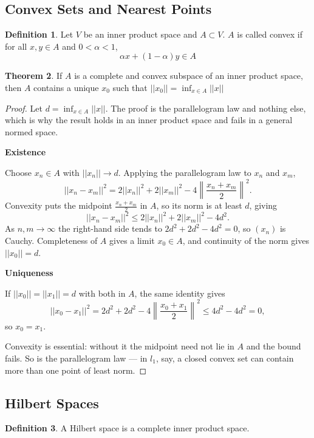 \documentclass[11pt,a4paper]{article}
\theoremstyle{definition}
\newtheorem{thm}{Theorem}[section]
\newtheorem{defn}[thm]{Definition}
\newcommand{\subhead}[1]{%
  \par\medskip\noindent\textbf{#1}\par\nobreak\smallskip}
\begin{document}
\subsection{Convex Sets and Nearest Points}

\begin{defn}
Let $V$ be an inner product space and $A\subset V$. $A$ is called convex if for all $x,y\in A$ and $0<\alpha <1$, $$\alpha x+(1-\alpha)y\in A$$
\end{defn}


\begin{thm}
If $A$ is a complete and convex subspace of an inner product space, then $A$ contains a unique $x_0$ such that \hspace{0.2cm}$\displaystyle{||x_0||=\inf_{x\in A}||x||}$




\end{thm}

\begin{proof}
Let $d=\inf_{x\in A}||x||$. The proof is the parallelogram law and nothing else,
which is why the result holds in an inner product space and fails in a general
normed space.

\subhead{Existence}
Choose $x_n\in A$ with $||x_n||\rightarrow d$. Applying the parallelogram law
to $x_n$ and $x_m$,
$$||x_n-x_m||^2=2||x_n||^2+2||x_m||^2-4\left\|\frac{x_n+x_m}{2}\right\|^2 .$$
Convexity puts the midpoint $\frac{x_n+x_m}{2}$ in $A$, so its norm is at least
$d$, giving
$$||x_n-x_m||^2\leq 2||x_n||^2+2||x_m||^2-4d^2 .$$
As $n,m\rightarrow\infty$ the right-hand side tends to
$2d^2+2d^2-4d^2=0$, so $(x_n)$ is Cauchy. Completeness of $A$ gives a limit
$x_0\in A$, and continuity of the norm gives $||x_0||=d$.

\subhead{Uniqueness}
If $||x_0||=||x_1||=d$ with both in $A$, the same identity gives
$$||x_0-x_1||^2=2d^2+2d^2-4\left\|\frac{x_0+x_1}{2}\right\|^2\leq 4d^2-4d^2=0 ,$$
so $x_0=x_1$.

Convexity is essential: without it the midpoint need not lie in $A$ and the
bound fails. So is the parallelogram law --- in $l_1$, say, a closed convex set
can contain more than one point of least norm.
\end{proof}


\subsection{Hilbert Spaces}

\begin{defn}
A Hilbert space is a complete inner product space.

\end{defn}
\end{document}

